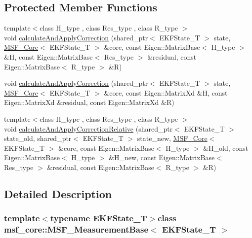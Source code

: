 \subsection*{Protected Member Functions}
\begin{DoxyCompactItemize}
\item 
{\footnotesize template$<$class H\-\_\-type , class Res\-\_\-type , class R\-\_\-type $>$ }\\void \hyperlink{classmsf__core_1_1MSF__MeasurementBase_a569c0772641a11d707349aab9dc0da7e}{calculate\-And\-Apply\-Correction} (shared\-\_\-ptr$<$ E\-K\-F\-State\-\_\-\-T $>$ state, \hyperlink{classmsf__core_1_1MSF__Core}{M\-S\-F\-\_\-\-Core}$<$ E\-K\-F\-State\-\_\-\-T $>$ \&core, const Eigen\-::\-Matrix\-Base$<$ H\-\_\-type $>$ \&H, const Eigen\-::\-Matrix\-Base$<$ Res\-\_\-type $>$ \&residual, const Eigen\-::\-Matrix\-Base$<$ R\-\_\-type $>$ \&R)
\item 
void \hyperlink{classmsf__core_1_1MSF__MeasurementBase_ade8ddcc9ef64571451560079381ecc64}{calculate\-And\-Apply\-Correction} (shared\-\_\-ptr$<$ E\-K\-F\-State\-\_\-\-T $>$ state, \hyperlink{classmsf__core_1_1MSF__Core}{M\-S\-F\-\_\-\-Core}$<$ E\-K\-F\-State\-\_\-\-T $>$ \&core, const Eigen\-::\-Matrix\-Xd \&H, const Eigen\-::\-Matrix\-Xd \&residual, const Eigen\-::\-Matrix\-Xd \&R)
\item 
{\footnotesize template$<$class H\-\_\-type , class Res\-\_\-type , class R\-\_\-type $>$ }\\void \hyperlink{classmsf__core_1_1MSF__MeasurementBase_a5b9db1020711ae6b5ba4e877dd03fa42}{calculate\-And\-Apply\-Correction\-Relative} (shared\-\_\-ptr$<$ E\-K\-F\-State\-\_\-\-T $>$ state\-\_\-old, shared\-\_\-ptr$<$ E\-K\-F\-State\-\_\-\-T $>$ state\-\_\-new, \hyperlink{classmsf__core_1_1MSF__Core}{M\-S\-F\-\_\-\-Core}$<$ E\-K\-F\-State\-\_\-\-T $>$ \&core, const Eigen\-::\-Matrix\-Base$<$ H\-\_\-type $>$ \&H\-\_\-old, const Eigen\-::\-Matrix\-Base$<$ H\-\_\-type $>$ \&H\-\_\-new, const Eigen\-::\-Matrix\-Base$<$ Res\-\_\-type $>$ \&residual, const Eigen\-::\-Matrix\-Base$<$ R\-\_\-type $>$ \&R)
\end{DoxyCompactItemize}


\subsection{Detailed Description}
\subsubsection*{template$<$typename E\-K\-F\-State\-\_\-\-T$>$class msf\-\_\-core\-::\-M\-S\-F\-\_\-\-Measurement\-Base$<$ E\-K\-F\-State\-\_\-\-T $>$}

